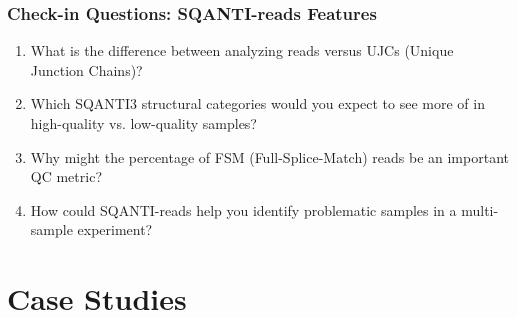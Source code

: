 \documentclass[aspectratio=169]{beamer}
\begin{document}
\begin{frame}
  \frametitle{Check-in Questions: SQANTI-reads Features}
  \begin{enumerate}
    \item What is the difference between analyzing reads versus UJCs (Unique Junction Chains)?
    \vspace{0.5cm}
    \item Which SQANTI3 structural categories would you expect to see more of in high-quality vs. low-quality samples?
    \vspace{0.5cm}
    \item Why might the percentage of FSM (Full-Splice-Match) reads be an important QC metric?
    \vspace{0.5cm}
    \item How could SQANTI-reads help you identify problematic samples in a multi-sample experiment?
  \end{enumerate}
\end{frame}

\section{Case Studies}
\end{document}
